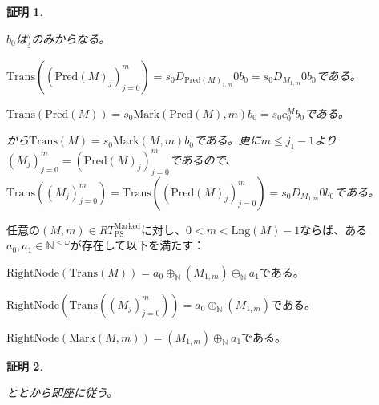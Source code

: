\documentclass[dvipdfmx,uplatex]{jsarticle}
\theoremstyle{customnonumberbreakfortheorem}
\theoremstyle{customnonumberbreakforproof}
\newtheorem{hideableproof}{証明}
\begin{document}
\begin{hideableproof}
\begin{indented}
\begin{indented}
			\begin{penumerate}
				\item \(b_0\)は\(\underline{)}\)のみからなる。
				\item \(\textrm{Trans}((\textrm{Pred}(M)_j)_{j=0}^{m}) = s_0 D_{\textrm{Pred}(M)_{1,m}} 0 b_0 = s_0 D_{M_{1,m}} 0 b_0\)である。
				\item \(\textrm{Trans}(\textrm{Pred}(M)) = s_0 \textrm{Mark}(\textrm{Pred}(M),m) b_0 = s_0 c_0^M b_0\)である。
			\end{penumerate}
			\item {}から\(\textrm{Trans}(M) = s_0 \textrm{Mark}(M,m) b_0\)である。更に\(m \leq j_1-1\)より\((M_j)_{j=0}^{m} = (\textrm{Pred}(M)_j)_{j=0}^{m}\)であるので、\(\textrm{Trans}((M_j)_{j=0}^{m}) = \textrm{Trans}((\textrm{Pred}(M)_j)_{j=0}^{m}) = s_0 D_{M_{1,m}} 0 b_0\)である。
		\end{indented}
	\end{indented}
\end{hideableproof}

\begin{corollary}\label{RightNodesとMarkの関係}
	任意の\((M,m) \in RT_{\textrm{PS}}^{\textrm{Marked}}\)に対し、\(0 < m < \textrm{Lng}(M) - 1\)ならば、ある\(a_0, a_1 \in \mathbb{N}^{< \omega}\)が存在して以下を満たす：
	\begin{penumerate}
		\item \(\textrm{RightNode}(\textrm{Trans}(M)) = a_0 \oplus_{\mathbb{N}} (M_{1,m}) \oplus_{\mathbb{N}} a_1\)である。
		\item \(\textrm{RightNode}(\textrm{Trans}((M_j)_{j=0}^{m})) = a_0 \oplus_{\mathbb{N}} (M_{1,m})\)である。
		\item \(\textrm{RightNode}(\textrm{Mark}(M,m)) = (M_{1,m}) \oplus_{\mathbb{N}} a_1\)である。
	\end{penumerate}
\end{corollary}

\begin{hideableproof}
	\begin{indented}
		\item {}ととから即座に従う。
	\end{indented}
\end{hideableproof}
\end{document}
